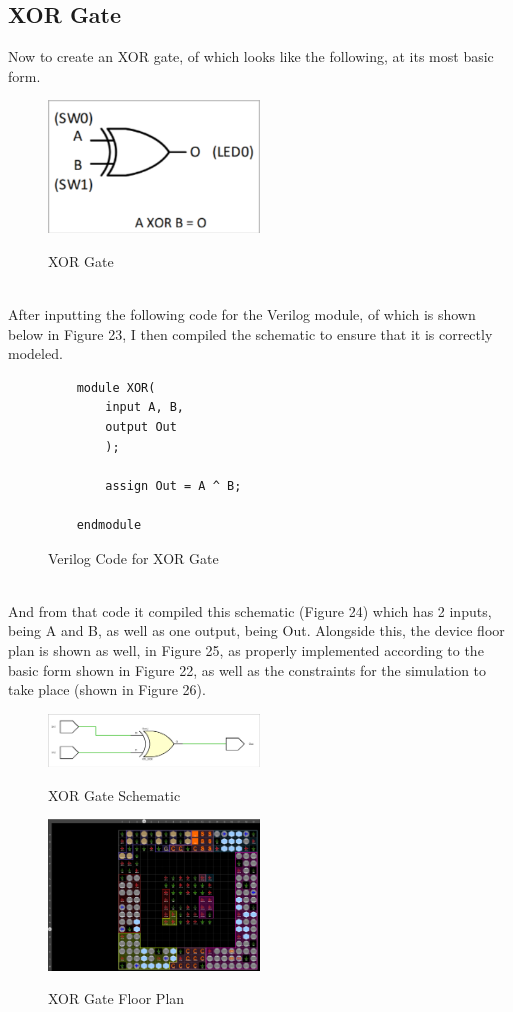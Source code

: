 \documentclass{article}
\begin{document}
\subsection{XOR Gate}
Now to create an XOR gate, of which looks like the following, at its most basic form.
\begin{figure}[!htbp]
    \centering
    \caption{XOR Gate}
    \includegraphics[width=0.5\textwidth]{XOR-GATE.png}
    \label{XOR Gate, Simple}
\end{figure}\\
After inputting the following code for the Verilog module, of which is shown below in Figure 23, I then compiled the schematic to ensure that it is correctly modeled.
\begin{figure}[!htbp]
    \centering
    \caption{Verilog Code for XOR Gate}
    \begin{verbatim}
    module XOR(
        input A, B,
        output Out
        );
        
        assign Out = A ^ B;
        
    endmodule
    \end{verbatim}
\end{figure}\\
And from that code it compiled this schematic (Figure 24) which has 2 inputs, being A and B, as well as one output, being Out. Alongside this, the device floor plan is shown as well, in Figure 25, as properly implemented according to the basic form shown in Figure 22, as well as the constraints for the simulation to take place (shown in Figure 26).
\begin{figure}[!htbp]
    \centering
    \caption{XOR Gate Schematic}
    \includegraphics[width=0.5\textwidth]{XOR-GATE-SCHEMATIC.png}
    \label{XOR Gate, Schematic}
\end{figure}
\begin{figure}[!htbp]
    \centering
    \caption{XOR Gate Floor Plan}
    \includegraphics[width=0.5\textwidth]{XOR-GATE-FLOOR-PLAN.png}
    \label{XOR Gate, Floor Plan}
\end{figure}
\end{document}
